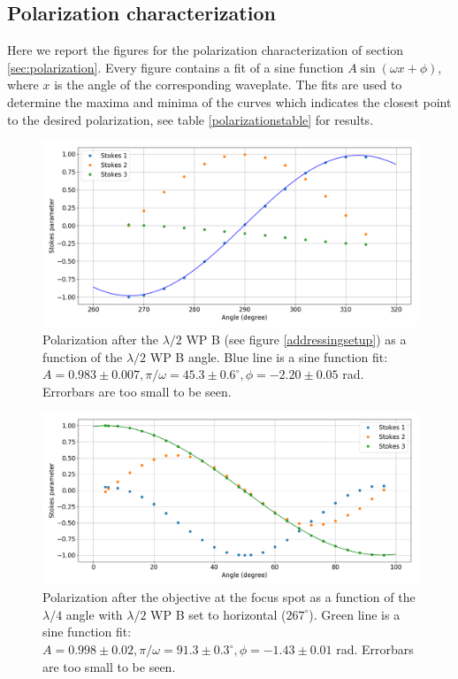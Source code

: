 \documentclass[english, a4paper, 12pt, twoside]{book}
\numberwithin{equation}{section} %
\begin{document}
\begin{appendices}

\chapter{Polarization characterization}
\label{app:polarization}
Here we report the figures for the polarization characterization of section \ref{sec:polarization}. Every figure contains a fit of a sine function $A\sin(\omega x +\phi)$, where $x$ is the angle of the corresponding waveplate. The fits are used to determine the maxima and minima of the curves which indicates the closest point to the desired polarization, see table \ref{polarizationstable} for results.
\begin{figure}[H]
\centering
\includegraphics[width = \textwidth]{pol3}
\caption{Polarization after the $\lambda/2$ WP B (see figure \ref{addressingsetup}) as a function of the $\lambda/2$ WP B angle. Blue line is a sine function fit: $A = 0.983 \pm 0.007, \pi/\omega = 45.3 \pm 0.6^\circ, \phi = -2.20\pm0.05$ rad. Errorbars are too small to be seen.}
\label{pol1}
\end{figure}
\begin{figure}[H]
\centering
\includegraphics[width = \textwidth]{pol1}
\caption{Polarization after the objective at the focus spot as a function of the $\lambda/4$ angle with $\lambda/2$ WP B set to horizontal ($267^\circ$). Green line is a sine function fit: $A = 0.998\pm 0.02, \pi/\omega = 91.3\pm0.3^\circ, \phi = -1.43\pm0.01$ rad. Errorbars are too small to be seen.}

\end{figure}
\end{appendices}
\end{document}
